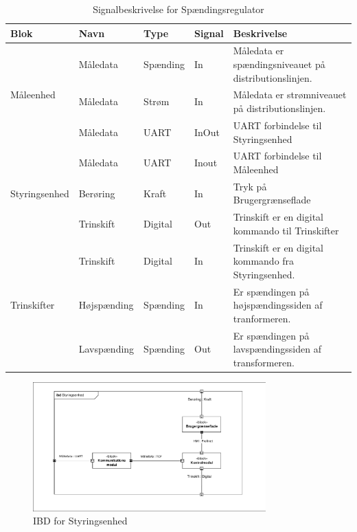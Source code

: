 \begin{table}[H]
	\centering
	\begin{tabular}{|l|l|l|l|p{4cm}|}
		\hline
		\textbf{Blok} & \textbf{Navn} & \textbf{Type} & \textbf{Signal} & 
		\textbf{Beskrivelse} \\\hline
		
		\multirow{3}{*}{Måleenhed} 
		& Måledata & Spænding & In & Måledata er spændingsniveauet på distributionslinjen. \\\hhline{~----} 
		& Måledata & Strøm & In & Måledata er strømniveauet på distributionslinjen. \\\hhline{~----} 
		& Måledata & UART & InOut & UART forbindelse til Styringsenhed \\\hline
		
		\multirow{3}{*}{Styringsenhed} 
		& Måledata & UART & Inout & UART forbindelse til Måleenhed \\\hhline{~----} 
		& Berøring & Kraft & In & Tryk på Brugergrænseflade \\\hhline{~----} 
		& Trinskift & Digital & Out & Trinskift er en digital kommando til Trinskifter \\\hline
		
		\multirow{3}{*}{Trinskifter} 
		& Trinskift & Digital & In & Trinskift er en digital kommando fra Styringsenhed. \\\hhline{~----} 
		& Højspænding & Spænding & In & Er spændingen på højspændingssiden af tranformeren. \\\hhline{~----} 
		& Lavspænding & Spænding & Out & Er spændingen på lavspændingssiden af transformeren. \\\hline
	\end{tabular}
	\caption{Signalbeskrivelse for Spændingsregulator}
	\label{tab:SignalbeskrivelseSp}
	
\end{table}


\begin{figure}[htbp] %
	\centering
	\includegraphics[width=0.8\textwidth]{Figure/IBDStyringsenhed}
	\caption{IBD for Styringsenhed}
	\label{fig:IBDSt}
\end{figure}

